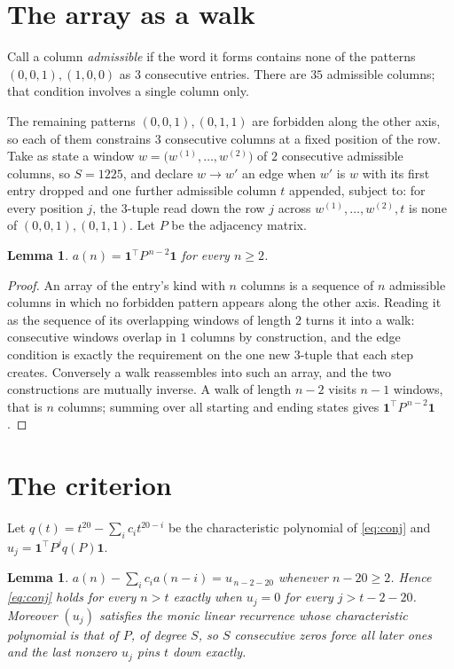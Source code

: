 \documentclass[11pt,a4paper]{article}
\theoremstyle{plain}
\newtheorem{lemma}[theorem]{Lemma}
\theoremstyle{definition}
\begin{document}
\section{The array as a walk}

Call a column \emph{admissible} if the word it forms contains none of the patterns
$(0,0,1), (1,0,0)$ as $3$ consecutive entries. There are $35$ admissible columns; that condition
involves a single column only.

The remaining patterns $(0,0,1), (0,1,1)$ are forbidden along the other axis, so each of them
constrains $3$ consecutive columns at a fixed position of the row. Take as state a
window $w=\bigl(w^{(1)},\dots,w^{(2)}\bigr)$ of $2$ consecutive admissible
columns, so $S=1225$, and declare $w\to w'$ an edge when $w'$ is $w$ with its first entry
dropped and one further admissible column $t$ appended, subject to: for every position
$j$, the $3$-tuple read down the row $j$ across $w^{(1)},\dots,w^{(2)},t$
is none of $(0,0,1), (0,1,1)$. Let $P$ be the adjacency matrix.

\begin{lemma}\label{lem:walk}
$a(n)=\mathbf{1}^{\!\top}P^{\,n-2}\mathbf{1}$ for every $n\ge2$.
\end{lemma}

\begin{proof}
An array of the entry's kind with $n$ columns is a sequence of $n$ admissible columns in
which no forbidden pattern appears along the other axis. Reading it as the sequence of its
overlapping windows of length $2$ turns it into a walk: consecutive windows overlap in
$1$ columns by construction, and the edge condition is exactly the requirement on the one
new $3$-tuple that each step creates. Conversely a walk reassembles into such an array,
and the two constructions are mutually inverse. A walk of length $n-2$ visits $n-1$
windows, that is $n$ columns; summing over all starting and ending states gives
$\mathbf{1}^{\!\top}P^{\,n-2}\mathbf{1}$.
\end{proof}

\section{The criterion}

Let $q(t)=t^{20}-\sum_i c_i t^{20-i}$ be the characteristic polynomial of
\eqref{eq:conj} and $u_j=\mathbf{1}^{\!\top}P^{j}q(P)\mathbf{1}$.

\begin{lemma}\label{lem:crit}
$a(n)-\sum_i c_i a(n-i)=u_{\,n-2-20}$ whenever $n-20\ge2$. Hence
\eqref{eq:conj} holds for every $n>t$ exactly when $u_j=0$ for every
$j>t-2-20$. Moreover $(u_j)$ satisfies the monic linear recurrence whose
characteristic polynomial is that of $P$, of degree $S$, so $S$ consecutive zeros force all
later ones and the last nonzero $u_j$ pins $t$ down exactly.
\end{lemma}
\end{document}
